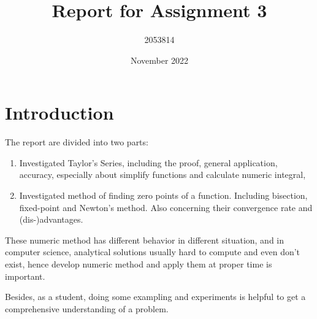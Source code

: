 \documentclass{article}
\title{Report for Assignment 3}
\author{2053814 }
\date{November 2022}
\begin{document}
\maketitle


\lstset{style=mystyle}

\newcommand*\sepline{%
  \begin{center}
    \rule[1ex]{\textwidth}{.5pt}
  \end{center}}

\section{Introduction}

The report are divided into two parts:

\begin{enumerate}
    \item Investigated Taylor's Series, including the proof, general application, accuracy, especially about simplify functions and calculate numeric integral,
    \item Investigated method of finding zero points of a function. Including bisection, fixed-point and Newton's method. Also concerning their convergence rate and (dis-)advantages.
\end{enumerate}

These numeric method has different behavior in different situation, and in computer science, analytical solutions usually hard to compute and even don't exist, hence develop numeric method and apply them at proper time is important.

Besides, as a student, doing some exampling and experiments is helpful to get a comprehensive understanding of a problem. 
\end{document}
